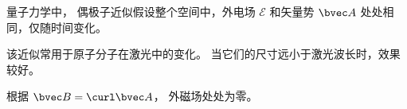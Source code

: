
\begin{issues}
\issueDraft
\end{issues}

量子力学中， 偶极子近似假设整个空间中，外电场 $\mathcal{E}$ 和矢量势 $\bvec A$ 处处相同，仅随时间变化。

该近似常用于原子分子在激光中的变化。 当它们的尺寸远小于激光波长时，效果较好。

根据 $\bvec B = \curl \bvec A$， 外磁场处处为零。

